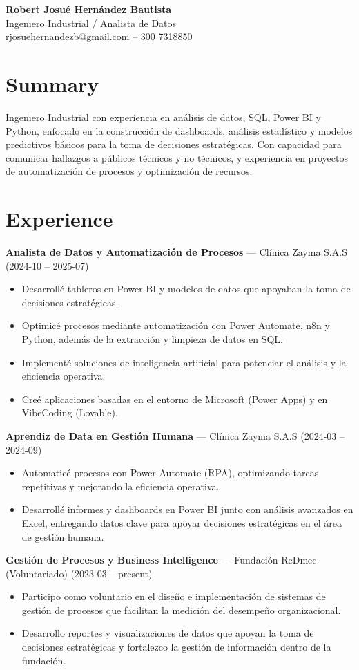 \documentclass[11pt]{article}
\begin{document}
\begin{center}
{\Large \textbf{Robert Josué Hernández Bautista}}\\
Ingeniero Industrial / Analista de Datos\\
rjosuehernandezb@gmail.com -- 300 7318850
\end{center}

\section*{Summary}
Ingeniero Industrial con experiencia en análisis de datos, SQL, Power BI y Python, enfocado en la construcción de dashboards, análisis estadístico y modelos predictivos básicos para la toma de decisiones estratégicas. Con capacidad para comunicar hallazgos a públicos técnicos y no técnicos, y experiencia en proyectos de automatización de procesos y optimización de recursos.

\section*{Experience}
\textbf{Analista de Datos y Automatización de Procesos} --- Clínica Zayma S.A.S (2024-10 -- 2025-07)
\begin{itemize}[nosep]
\item Desarrollé tableros en Power BI y modelos de datos que apoyaban la toma de decisiones estratégicas.
\item Optimicé procesos mediante automatización con Power Automate, n8n y Python, además de la extracción y limpieza de datos en SQL.
\item Implementé soluciones de inteligencia artificial para potenciar el análisis y la eficiencia operativa.
\item Creé aplicaciones basadas en el entorno de Microsoft (Power Apps) y en VibeCoding (Lovable).
\end{itemize}
\textbf{Aprendiz de Data en Gestión Humana} --- Clínica Zayma S.A.S (2024-03 -- 2024-09)
\begin{itemize}[nosep]
\item Automaticé procesos con Power Automate (RPA), optimizando tareas repetitivas y mejorando la eficiencia operativa.
\item Desarrollé informes y dashboards en Power BI junto con análisis avanzados en Excel, entregando datos clave para apoyar decisiones estratégicas en el área de gestión humana.
\end{itemize}
\textbf{Gestión de Procesos y Business Intelligence} --- Fundación ReDmec (Voluntariado) (2023-03 -- present)
\begin{itemize}[nosep]
\item Participo como voluntario en el diseño e implementación de sistemas de gestión de procesos que facilitan la medición del desempeño organizacional.
\item Desarrollo reportes y visualizaciones de datos que apoyan la toma de decisiones estratégicas y fortalezco la gestión de información dentro de la fundación.
\end{itemize}
\end{document}

